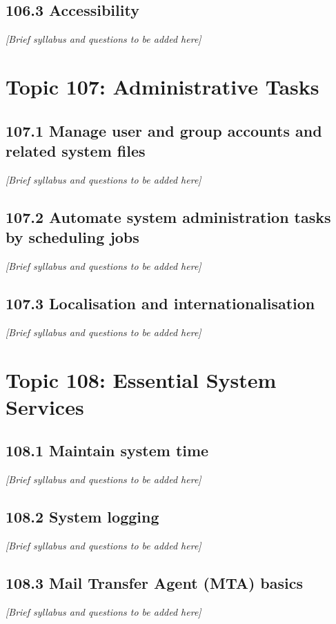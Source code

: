 \documentclass[12pt,a4paper]{report}
\begin{document}
\section{106.3 Accessibility}
\textit{[Brief syllabus and questions to be added here]}

\chapter{Topic 107: Administrative Tasks}
\section{107.1 Manage user and group accounts and related system files}
\textit{[Brief syllabus and questions to be added here]}

\section{107.2 Automate system administration tasks by scheduling jobs}
\textit{[Brief syllabus and questions to be added here]}

\section{107.3 Localisation and internationalisation}
\textit{[Brief syllabus and questions to be added here]}

\chapter{Topic 108: Essential System Services}
\section{108.1 Maintain system time}
\textit{[Brief syllabus and questions to be added here]}

\section{108.2 System logging}
\textit{[Brief syllabus and questions to be added here]}

\section{108.3 Mail Transfer Agent (MTA) basics}
\textit{[Brief syllabus and questions to be added here]}
\end{document}
